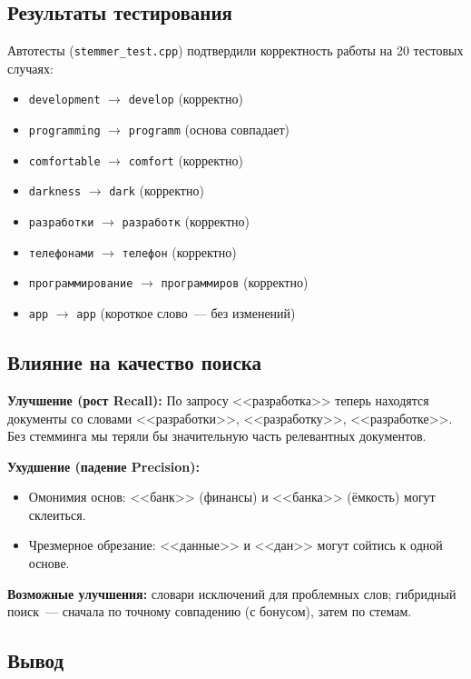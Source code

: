 \documentclass[12pt,a4paper]{article}
\begin{document}
\subsection{Результаты тестирования}

Автотесты (\texttt{stemmer\_test.cpp}) подтвердили корректность работы на 20 тестовых случаях:

\begin{itemize}
    \item \texttt{development} $\to$ \texttt{develop} (корректно)
    \item \texttt{programming} $\to$ \texttt{programm} (основа совпадает)
    \item \texttt{comfortable} $\to$ \texttt{comfort} (корректно)
    \item \texttt{darkness} $\to$ \texttt{dark} (корректно)
    \item \texttt{разработки} $\to$ \texttt{разработк} (корректно)
    \item \texttt{телефонами} $\to$ \texttt{телефон} (корректно)
    \item \texttt{программирование} $\to$ \texttt{программиров} (корректно)
    \item \texttt{app} $\to$ \texttt{app} (короткое слово~--- без изменений)
\end{itemize}

\subsection{Влияние на качество поиска}

\textbf{Улучшение (рост Recall):} По запросу <<разработка>> теперь находятся документы со словами <<разработки>>, <<разработку>>, <<разработке>>. Без стемминга мы теряли бы значительную часть релевантных документов.

\textbf{Ухудшение (падение Precision):}
\begin{itemize}
    \item Омонимия основ: <<банк>> (финансы) и <<банка>> (ёмкость) могут склеиться.
    \item Чрезмерное обрезание: <<данные>> и <<дан>> могут сойтись к одной основе.
\end{itemize}

\textbf{Возможные улучшения:} словари исключений для проблемных слов; гибридный поиск~--- сначала по точному совпадению (с бонусом), затем по стемам.

\subsection{Вывод}
\end{document}
